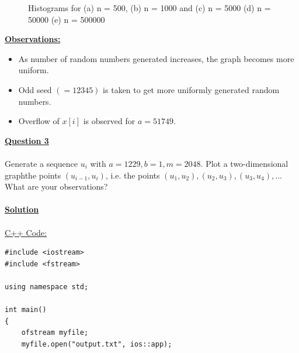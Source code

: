 \documentclass[11pt]{article}
\begin{document}
{\begin{figure}[H]
	\caption{Histograms for (a) n = 500, (b) n = 1000 and (c) n = 5000 (d) n = 50000 (e) n = 500000}
\end{figure}
\textbf{\underline{Observations:}}\\
\begin{itemize}
\item As number of random numbers generated increases, the graph becomes more uniform.
\item Odd seed $(=12345)$ is taken to get more uniformly generated random numbers.
\item Overflow of $x[i]$ is observed for $a=51749$.
\end{itemize}
\newpage
\Large\textbf{{\underline{Question 3}}}\\\\
Generate a sequence $u_i$ with $a=1229,b=1,m=2048$. Plot a two-dimensional graphthe points $(u_{i-1},u_i)$, i.e. the points $(u_1,u_2),(u_2,u_3),(u_3,u_4),...$ What are your observations?\\\\
\Large\textbf{{\underline{Solution}}}\\\\
\underline{C++ Code:}
\begin{lstlisting}
#include <iostream>
#include <fstream>

using namespace std;

int main()
{
	ofstream myfile;
	myfile.open("output.txt", ios::app);


\end{lstlisting}}
\end{document}
